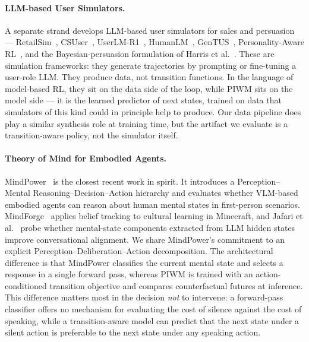 \documentclass{article}
\begin{document}
\paragraph{LLM-based User Simulators.}
A separate strand develops LLM-based user simulators for sales and persuasion --- RetailSim~\cite{RetailSim}, CSUser~\cite{CSales}, UserLM-R1~\cite{UserLMR1}, HumanLM~\cite{HumanLM}, GenTUS~\cite{GenTUS}, Personality-Aware RL~\cite{PersonalityRL}, and the Bayesian-persuasion formulation of Harris et al.~\cite{AlgorithmicPersuasion}. These are simulation frameworks: they generate trajectories by prompting or fine-tuning a user-role LLM. They produce data, not transition functions. In the language of model-based RL, they sit on the data side of the loop, while PIWM sits on the model side --- it is the learned predictor of next states, trained on data that simulators of this kind could in principle help to produce. Our data pipeline does play a similar synthesis role at training time, but the artifact we evaluate is a transition-aware policy, not the simulator itself.

\paragraph{Theory of Mind for Embodied Agents.}
MindPower~\cite{MindPower} is the closest recent work in spirit. It introduces a Perception--Mental Reasoning--Decision--Action hierarchy and evaluates whether VLM-based embodied agents can reason about human mental states in first-person scenarios. MindForge~\cite{MindForge} applies belief tracking to cultural learning in Minecraft, and Jafari et al.~\cite{ToMConversational} probe whether mental-state components extracted from LLM hidden states improve conversational alignment. We share MindPower's commitment to an explicit Perception--Deliberation--Action decomposition. The architectural difference is that MindPower classifies the current mental state and selects a response in a single forward pass, whereas PIWM is trained with an action-conditioned transition objective and compares counterfactual futures at inference. This difference matters most in the decision \emph{not} to intervene: a forward-pass classifier offers no mechanism for evaluating the cost of silence against the cost of speaking, while a transition-aware model can predict that the next state under a silent action is preferable to the next state under any speaking action.
\end{document}
